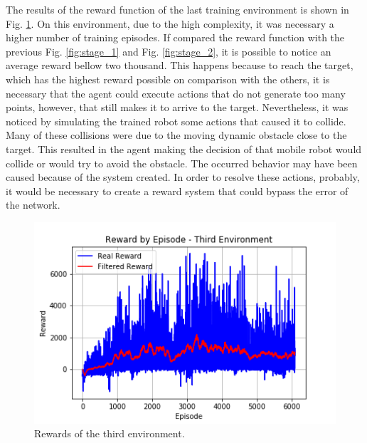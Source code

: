 The results of the reward function of the last training environment is shown in Fig. \ref{fig:stage_4}.
On this environment, due to the high complexity, it was necessary a higher number of training episodes.
If compared the reward function with the previous Fig. \ref{fig:stage_1} and Fig. \ref{fig:stage_2}, it is possible to notice an average reward bellow two thousand.
This happens because to reach the target, which has the highest reward possible on comparison with the others, it is necessary that the agent could execute actions that do not generate too many points, however, that still makes it to arrive to the target.
Nevertheless, it was noticed by simulating the trained robot some actions that caused it to collide.
Many of these collisions were due to the moving dynamic obstacle close to the target.
This resulted in the agent making the decision of that mobile robot would collide or would try to avoid the obstacle.
The occurred behavior may have been caused because of the system created.
In order to resolve these actions, probably, it would be necessary to create a reward system that could bypass the error of the network.

\begin{figure}[htbp]
\centerline{\includegraphics[width=\columnwidth]{images/stage_4.png}}
\caption{Rewards of the third environment.}
\label{fig:stage_4}
\end{figure}